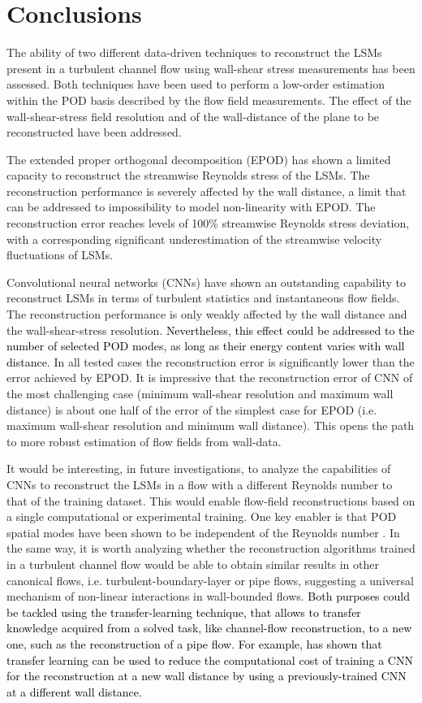 \section{\label{sec:04}Conclusions}

The ability of two different data-driven techniques to reconstruct the LSMs present in a turbulent channel flow using wall-shear stress measurements has been assessed.
Both techniques have been used to perform a low-order estimation within the POD basis described by the flow field measurements.
The effect of the wall-shear-stress field resolution and of the wall-distance of the plane to be reconstructed have been addressed.

The extended proper orthogonal decomposition (EPOD) has shown a limited capacity to reconstruct the streamwise Reynolds stress of the LSMs.
The reconstruction performance is severely affected by the wall distance, a limit that can be addressed to impossibility to model non-linearity with EPOD.
The reconstruction error reaches levels of 100\% streamwise Reynolds stress deviation, with a corresponding significant underestimation of the streamwise velocity fluctuations of LSMs.

Convolutional neural networks (CNNs) have shown an outstanding capability to reconstruct LSMs in terms of turbulent statistics and instantaneous flow fields.
The reconstruction performance is only weakly affected by the wall distance and the wall-shear-stress resolution.
\textcolor{black}{Nevertheless, this effect could be addressed to the number of selected POD modes, as long as their energy content varies with wall distance.}
In all tested cases the reconstruction error is significantly lower than the error achieved by EPOD.
It is impressive that the reconstruction error of CNN of the most challenging case (minimum wall-shear resolution and maximum wall distance) is about one half of the error of the simplest case for EPOD (i.e. maximum wall-shear resolution and minimum wall distance).
This opens the path to more robust estimation of flow fields from wall-data.

It would be interesting, in future investigations, to analyze the capabilities of CNNs to reconstruct the LSMs in a flow with a different Reynolds number to that of the training dataset.
This would enable flow-field reconstructions based on a single computational or experimental training. One key enabler is that POD spatial modes have been shown to be independent of the Reynolds number \citep{liu1994reynolds}.
In the same way, it is worth analyzing whether the reconstruction algorithms trained in a turbulent channel flow would be able to obtain similar results in other canonical flows, i.e. turbulent-boundary-layer or pipe flows, suggesting a universal mechanism of non-linear interactions in wall-bounded flows.
\textcolor{black}{Both purposes could be tackled using the transfer-learning technique, that allows to transfer knowledge acquired from a solved task, like channel-flow reconstruction, to a new one, such as the reconstruction of a pipe flow.
For example, \citet{guastoni2020prediction} has shown that transfer learning can be used to reduce the computational cost of training a CNN for the reconstruction at a new wall distance by using a previously-trained CNN at a different wall distance.}


